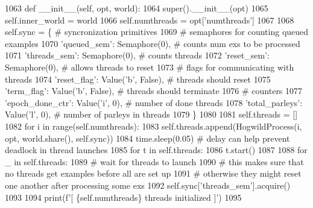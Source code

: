 \begin{DoxyCode}
1063     \textcolor{keyword}{def }\_\_init\_\_(self, opt, world):
1064         super().\_\_init\_\_(opt)
1065         self.inner\_world = world
1066         self.numthreads = opt[\textcolor{stringliteral}{'numthreads'}]
1067 
1068         self.sync = \{  \textcolor{comment}{# syncronization primitives}
1069             \textcolor{comment}{# semaphores for counting queued examples}
1070             \textcolor{stringliteral}{'queued\_sem'}: Semaphore(0),  \textcolor{comment}{# counts num exs to be processed}
1071             \textcolor{stringliteral}{'threads\_sem'}: Semaphore(0),  \textcolor{comment}{# counts threads}
1072             \textcolor{stringliteral}{'reset\_sem'}: Semaphore(0),  \textcolor{comment}{# allows threads to reset}
1073             \textcolor{comment}{# flags for communicating with threads}
1074             \textcolor{stringliteral}{'reset\_flag'}: Value(\textcolor{stringliteral}{'b'}, \textcolor{keyword}{False}),  \textcolor{comment}{# threads should reset}
1075             \textcolor{stringliteral}{'term\_flag'}: Value(\textcolor{stringliteral}{'b'}, \textcolor{keyword}{False}),  \textcolor{comment}{# threads should terminate}
1076             \textcolor{comment}{# counters}
1077             \textcolor{stringliteral}{'epoch\_done\_ctr'}: Value(\textcolor{stringliteral}{'i'}, 0),  \textcolor{comment}{# number of done threads}
1078             \textcolor{stringliteral}{'total\_parleys'}: Value(\textcolor{stringliteral}{'l'}, 0),  \textcolor{comment}{# number of parleys in threads}
1079         \}
1080 
1081         self.threads = []
1082         \textcolor{keywordflow}{for} i \textcolor{keywordflow}{in} range(self.numthreads):
1083             self.threads.append(HogwildProcess(i, opt, world.share(), self.sync))
1084             time.sleep(0.05)  \textcolor{comment}{# delay can help prevent deadlock in thread launches}
1085         \textcolor{keywordflow}{for} t \textcolor{keywordflow}{in} self.threads:
1086             t.start()
1087 
1088         \textcolor{keywordflow}{for} \_ \textcolor{keywordflow}{in} self.threads:
1089             \textcolor{comment}{# wait for threads to launch}
1090             \textcolor{comment}{# this makes sure that no threads get examples before all are set up}
1091             \textcolor{comment}{# otherwise they might reset one another after processing some exs}
1092             self.sync[\textcolor{stringliteral}{'threads\_sem'}].acquire()
1093 
1094         print(f\textcolor{stringliteral}{'[ \{self.numthreads\} threads initialized ]'})
1095 
\end{DoxyCode}


